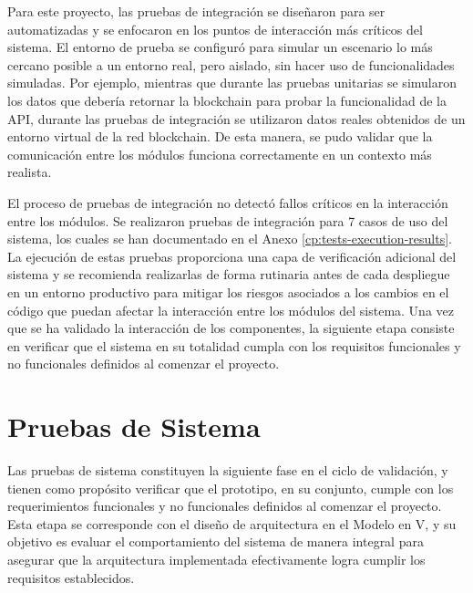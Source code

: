 Para este proyecto, las pruebas de integración se diseñaron para ser automatizadas y se enfocaron en los puntos de interacción más críticos del sistema. El entorno de prueba se configuró para simular un escenario lo más cercano posible a un entorno real, pero aislado, sin hacer uso de funcionalidades simuladas. Por ejemplo, mientras que durante las pruebas unitarias se simularon los datos que debería retornar la blockchain para probar la funcionalidad de la API, durante las pruebas de integración se utilizaron datos reales obtenidos de un entorno virtual de la red blockchain. De esta manera, se pudo validar que la comunicación entre los módulos funciona correctamente en un contexto más realista.



El proceso de pruebas de integración no detectó fallos críticos en la interacción entre los módulos. Se realizaron pruebas de integración para 7 casos de uso del sistema, los cuales se han documentado en el Anexo \ref{cp:tests-execution-results}. La ejecución de estas pruebas proporciona una capa de verificación adicional del sistema y se recomienda realizarlas de forma rutinaria antes de cada despliegue en un entorno productivo para mitigar los riesgos asociados a los cambios en el código que puedan afectar la interacción entre los módulos del sistema. Una vez que se ha validado la interacción de los componentes, la siguiente etapa consiste en verificar que el sistema en su totalidad cumpla con los requisitos funcionales y no funcionales definidos al comenzar el proyecto.

\section{Pruebas de Sistema}
\label{sec:system-testing}

Las pruebas de sistema constituyen la siguiente fase en el ciclo de validación, y tienen como propósito verificar que el prototipo, en su conjunto, cumple con los requerimientos funcionales y no funcionales definidos al comenzar el proyecto. Esta etapa se corresponde con el diseño de arquitectura en el Modelo en V, y su objetivo es evaluar el comportamiento del sistema de manera integral para asegurar que la arquitectura implementada efectivamente logra cumplir los requisitos establecidos.

